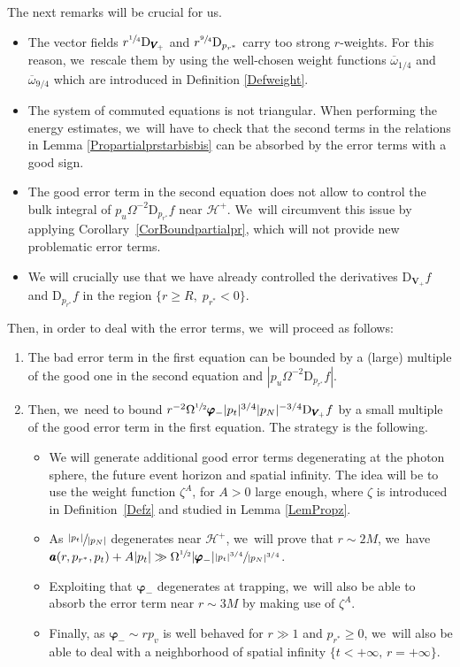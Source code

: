 \documentclass[JEP,XML,SOM,Unicode,published]{cedram}
\theoremstyle{plain}
\theoremstyle{definition}
\newcommand\z{{\zeta}}
\renewcommand\H{{\mathcal{H}^+}}
\begin{document}
The next remarks will be crucial for us.
\begin{itemize}
\item The vector fields $r^{\sfrac{1}{4}}\mathrm{D}_{\pmb{V}_{\!+}}$ and $r^{\sfrac{9}{4}} \mathrm{D}_{p_{r^*}}$ carry too strong $r$-weights. For this reason, we~rescale them by using the well-chosen weight functions $\overline{\omega}_{1/4}$ and $\overline{\omega}_{9/4}$ which are introduced in Definition \ref{Defweight}.
\item The system of commuted equations is not triangular. When performing the energy estimates, we~will have to check that the second terms in the relations in Lemma \ref{Propartialprstarbisbis} can be absorbed by the error terms with a good sign.
\item The good error term in the second equation does not allow to control the bulk integral of $p_u\Omega^{-2} \mathrm{D}_{p_{r^*}}f$ near $\H$. We~will circumvent this issue by applying Corollary~\ref{CorBoundpartialpr}, which will not provide new problematic error terms.
\item We will crucially use that we have already controlled the derivatives $\mathrm{D}_{\pmb{V}_{\!+}} f$ and $ \mathrm{D}_{p_{r^*}}f$ in the region $\{ r \geq R, \; p_{r^*} <0 \}$.
\end{itemize}

Then, in order to deal with the error terms, we~will proceed as follows:
\begin{enumerate}
\item The bad error term in the first equation can be bounded by a (large) multiple of the good one in the second equation and $|p_u\Omega^{-2} \mathrm{D}_{p_{r^*}}f|$.
\item Then, we~need to bound $r^{-2}\Omega^{\sfrac{1}{2}}\pmb{\varphi}_-|p_t|^{3/4}|p_N|^{-3/4} \mathrm{D}_{\pmb{V}_{\!+}} f$ by a small multiple of the good error term in the first equation. The strategy is the following.
\begin{itemize}
\item We will generate additional good error terms degenerating at the photon sphere, the future event horizon and spatial infinity. The idea will be to use the weight function $\z^A$, for $A>0$ large enough, where $\z$ is introduced in Definition~\ref{Defz} and studied in Lemma \ref{LemPropz}.
\item As $\sfrac{|p_t|}{|p_N|}$ degenerates near $\H\!$, we~will prove that $r \sim 2M$, we~have $\pmb{a}(r,p_{r^*},p_t)+A|p_t| \gg \Omega^{\sfrac{1}{2}}|\pmb{\varphi}_-|\sfrac{|p_t|^{3/4}}{|p_N|^{3/4}}$.
\item Exploiting that $\pmb{\varphi}_-$ degenerates at trapping, we~will also be able to absorb the error term near $r \sim 3M$ by making use of $\z^A$.
\item Finally, as $\pmb{\varphi}_- \sim rp_v$ is well behaved for $r \gg 1$ and $p_{r^*} \geq 0$, we~will also be able to deal with a neighborhood of spatial infinity $\{ t <+\infty, \, r=+\infty \}$.
\end{itemize}
\end{enumerate}
\end{document}
